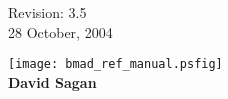 \thispagestyle{empty}

\begin{flushright}
\large
  Revision: 3.5 \\
  28 October, 2004 \\
\end{flushright}

\vfill

{
\begin{center}
\texttt{[image: bmad\_ref\_manual.psfig]} \\
\vskip 0.3in
\huge\bf David Sagan
\end{center}
}

\vfill
\break